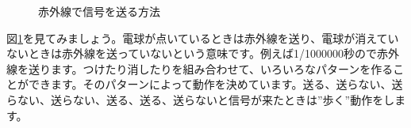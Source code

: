 \begin{figure}[H]
\centering

\caption{赤外線で信号を送る方法}
\label{ir}
\end{figure}

図\ref{ir}を見てみましょう。電球が点いているときは赤外線を送り、電球が消えていないときは赤外線を送っていないという意味です。例えば1/1000000秒ので赤外線を送ります。つけたり消したりを組み合わせて、いろいろなパターンを作ることができます。そのパターンによって動作を決めています。送る、送らない、送らない、送らない、送る、送る、送らないと信号が来たときは”歩く”動作をします。
